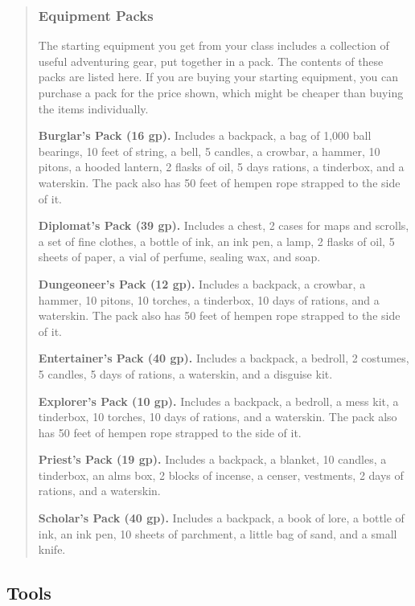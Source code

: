 \documentclass[
]{article}
\begin{document}
\begin{quote}
\hypertarget{equipment-packs}{%
\subsubsection{Equipment Packs}\label{equipment-packs}}

The starting equipment you get from your class includes a collection of
useful adventuring gear, put together in a pack. The contents of these
packs are listed here. If you are buying your starting equipment, you
can purchase a pack for the price shown, which might be cheaper than
buying the items individually.

\textbf{Burglar's Pack (16 gp).} Includes a backpack, a bag of 1,000
ball bearings, 10 feet of string, a bell, 5 candles, a crowbar, a
hammer, 10 pitons, a hooded lantern, 2 flasks of oil, 5 days rations, a
tinderbox, and a waterskin. The pack also has 50 feet of hempen rope
strapped to the side of it.

\textbf{Diplomat's Pack (39 gp).} Includes a chest, 2 cases for maps and
scrolls, a set of fine clothes, a bottle of ink, an ink pen, a lamp, 2
flasks of oil, 5 sheets of paper, a vial of perfume, sealing wax, and
soap.

\textbf{Dungeoneer's Pack (12 gp).} Includes a backpack, a crowbar, a
hammer, 10 pitons, 10 torches, a tinderbox, 10 days of rations, and a
waterskin. The pack also has 50 feet of hempen rope strapped to the side
of it.

\textbf{Entertainer's Pack (40 gp).} Includes a backpack, a bedroll, 2
costumes, 5 candles, 5 days of rations, a waterskin, and a disguise kit.

\textbf{Explorer's Pack (10 gp).} Includes a backpack, a bedroll, a mess
kit, a tinderbox, 10 torches, 10 days of rations, and a waterskin. The
pack also has 50 feet of hempen rope strapped to the side of it.

\textbf{Priest's Pack (19 gp).} Includes a backpack, a blanket, 10
candles, a tinderbox, an alms box, 2 blocks of incense, a censer,
vestments, 2 days of rations, and a waterskin.

\textbf{Scholar's Pack (40 gp).} Includes a backpack, a book of lore, a
bottle of ink, an ink pen, 10 sheets of parchment, a little bag of sand,
and a small knife.
\end{quote}

\hypertarget{tools}{%
\subsection{Tools}\label{tools}}
\end{document}
